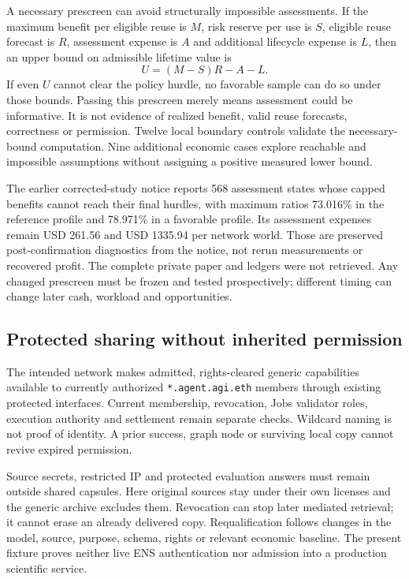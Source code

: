 \documentclass[11pt]{article}
\begin{document}
A necessary prescreen can avoid structurally impossible assessments. If the maximum benefit per eligible reuse is $M$, risk reserve per use is $S$, eligible reuse forecast is $R$, assessment expense is $A$ and additional lifecycle expense is $L$, then an upper bound on admissible lifetime value is
\begin{equation}
U=(M-S)R-A-L.
\end{equation}
If even $U$ cannot clear the policy hurdle, no favorable sample can do so under those bounds. Passing this prescreen merely means assessment could be informative. It is not evidence of realized benefit, valid reuse forecasts, correctness or permission. Twelve local boundary controls validate the necessary-bound computation. Nine additional economic cases explore reachable and impossible assumptions without assigning a positive measured lower bound.

The earlier corrected-study notice reports 568 assessment states whose capped benefits cannot reach their final hurdles, with maximum ratios 73.016\% in the reference profile and 78.971\% in a favorable profile. Its assessment expenses remain USD 261.56 and USD 1335.94 per network world. Those are preserved post-confirmation diagnostics from the notice, not rerun measurements or recovered profit. The complete private paper and ledgers were not retrieved.\citep{advantage} Any changed prescreen must be frozen and tested prospectively; different timing can change later cash, workload and opportunities.

\subsection{Protected sharing without inherited permission}

The intended network makes admitted, rights-cleared generic capabilities available to currently authorized \texttt{*.agent.agi.eth} members through existing protected interfaces. Current membership, revocation, Jobs validator roles, execution authority and settlement remain separate checks. Wildcard naming is not proof of identity. A prior success, graph node or surviving local copy cannot revive expired permission.

Source secrets, restricted IP and protected evaluation answers must remain outside shared capsules. Here original sources stay under their own licenses and the generic archive excludes them. Revocation can stop later mediated retrieval; it cannot erase an already delivered copy. Requalification follows changes in the model, source, purpose, schema, rights or relevant economic baseline. The present fixture proves neither live ENS authentication nor admission into a production scientific service.
\end{document}
